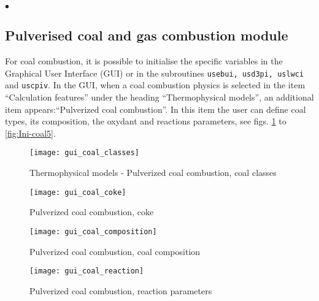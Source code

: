 {{{\begin{list}{$\bullet$}{}
\end{list}

\clearpage


\subsection{Pulverised
  coal and gas combustion module}
\label{sec:Ini-coal}
For coal combustion, it is possible to initialise the specific variables in the Graphical User Interface (GUI) or in the subroutines \texttt{usebui, usd3pi, uslwci} and \texttt{uscpiv}. In the GUI, when a coal combustion physics is selected in the item ``Calculation features'' under the heading ``Thermophysical models'', an additional item appears:``Pulverized coal combustion''. In this item the user can define coal types, its composition, the oxydant and reactions parameters, see figs. \ref{fig:Ini-coal1} to \ref{fig:Ini-coal5}.

\begin{figure}[!ht]
\begin{center}
\texttt{[image: gui\_coal\_classes]}
\caption{Thermophysical models - Pulverized coal combustion, coal classes}
\label{fig:Ini-coal1}
\end{center}
\end{figure}

\begin{figure}[!ht]
\begin{center}
\texttt{[image: gui\_coal\_coke]}
\caption{Pulverized coal combustion, coke}
\label{fig:Ini-coal2}
\end{center}
\end{figure}

\begin{figure}[!ht]
\begin{center}
\texttt{[image: gui\_coal\_composition]}
\caption{Pulverized coal combustion, coal composition}
\label{fig:Ini-coal3}
\end{center}
\end{figure}

\begin{figure}[!ht]
\begin{center}
\texttt{[image: gui\_coal\_reaction]}
\caption{Pulverized coal combustion, reaction parameters}
\label{fig:Ini-coal4}
\end{center}
\end{figure}

}}}
